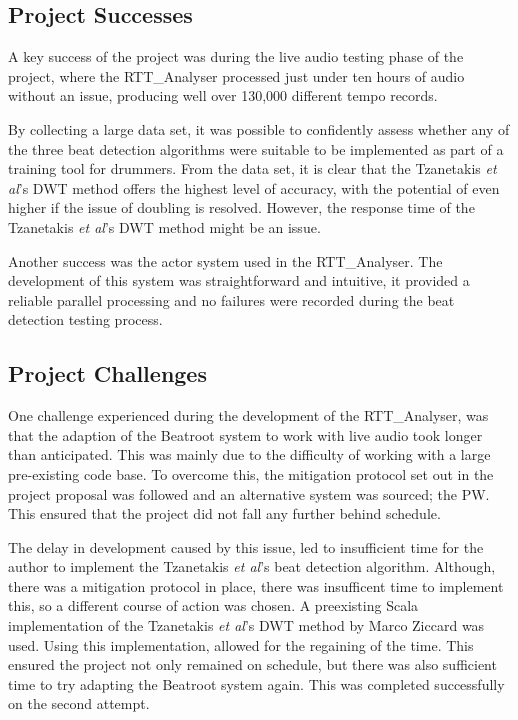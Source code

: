 \documentclass[a4paper, 11pt]{article}
\begin{document}
\subsection{Project Successes}

A key success of the project was during the live audio testing phase of the project, where the RTT\_Analyser processed just under ten hours of audio without an issue, producing well over 130,000 different tempo records.

By collecting a large data set, it was possible to confidently assess whether any of the three beat detection algorithms were suitable to be implemented as part of a training tool for drummers. From the data set, it is clear that the Tzanetakis \textit{et al}'s \cite{tzane1} DWT method offers the highest level of accuracy, with the potential of even higher if the issue of doubling is resolved. However, the response time of the Tzanetakis \textit{et al}'s \cite{tzane1} DWT method might be an issue. \par 

Another success was the actor system used in the RTT\_Analyser. The development of this system was straightforward and intuitive, it provided a reliable parallel processing and no failures were recorded during the beat detection testing process. 

\subsection{Project Challenges}

One challenge experienced during the development of the RTT\_Analyser, was that the adaption of the Beatroot system to work with live audio took longer than anticipated. This was mainly due to the difficulty of working with a large pre-existing code base. To overcome this, the mitigation protocol set out in the project proposal was followed and an alternative system was sourced; the PW. This ensured that the project did not fall any further behind schedule.\par 

The delay in development caused by this issue, led to insufficient time for the author to implement the Tzanetakis \textit{et al}'s \cite{tzane1} beat detection algorithm. Although, there was a mitigation protocol in place, there was insufficent time to implement this, so a different course of action was chosen. A preexisting Scala implementation of the Tzanetakis \textit{et al}'s \cite{tzane1} DWT method by Marco Ziccard\cite{marcoZin} was used. Using this implementation, allowed for the regaining of the time. This ensured the project not only remained on schedule, but there was also sufficient time to try adapting the Beatroot system again. This was completed successfully on the second attempt.\par
\end{document}
